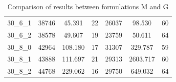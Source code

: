 \documentclass[preprint,12pt,authoryear]{elsarticle}
\begin{document}
\begin{table}[h!]
{\begin{tabular}{|c||c|c|c||c|c|c|}
30\_6\_1 & 38746 &    45.391 &       22 		& 26037 &    98.530 &       60 \\
30\_6\_2 & 38578 &    49.607 &       19 		& 23759 &    50.611 &       64 \\
30\_8\_0 & 42964 &   108.180 &      17 		& 31307 &   329.787 &       59 \\
30\_8\_1 & 43888 &   111.697 &       21 		& 29313 &  2603.717 &       60 \\
30\_8\_2 & 44768 &   229.062 &      16 		& 29750 &   649.032 &       64 \\
%
\hline
        \end{tabular}
        }
        \caption{Comparison of results between formulations M and G}
    \label{tab:M_vs_G_results}
\end{table}
\end{document}
